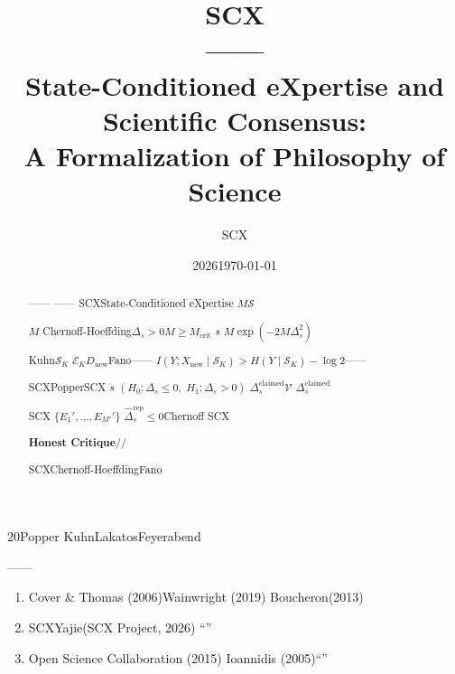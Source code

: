 \documentclass[11pt,a4paper]{article}
\title{\textbf{\LARGE SCX\\[6pt]——}\\[12pt]
\large State-Conditioned eXpertise and Scientific Consensus:\\A Formalization of Philosophy of Science}
\author{SCX}
\date{2026}
\date{\today}
\theoremstyle{remark}
\begin{document}
\maketitle

\begin{abstract}
——
——
\textbf{}SCXState-Conditioned eXpertise
$M$$\mathcal{S}$


\textbf{}$M$
Chernoff-Hoeffding$\Delta_s > 0$$M \geq M_{\text{crit}}$
$s$\textbf{}
\textbf{}$M$$\exp(-2M\Delta_s^2)$

\textbf{}Kuhn$\mathcal{S}_K$
$\mathcal{E}_K$$D_{\text{new}}$Fano——
$I(Y; X_{\text{new}} \mid \mathcal{S}_K) > H(Y \mid \mathcal{S}_K) - \log 2$——


\textbf{}SCXPopperSCX
$s$
$(H_0: \Delta_s \leq 0,\; H_1: \Delta_s > 0)$
$\Delta_s^{\text{claimed}}$$\mathcal{V}$
$\Delta_s^{\text{claimed}}$\textbf{}

\textbf{}SCX
$\{E_1',\ldots,E_{M'}'\}$
$\hat{\Delta}_s^{\text{rep}} \leq 0$Chernoff
SCX

\textbf{Honest Critique}//


\textbf{}SCXChernoff-HoeffdingFano
\end{abstract}

\section{}

\subsection{}

20Popper
KuhnLakatosFeyerabend

\textbf{}\textbf{}


——


\begin{enumerate}[label=(\arabic*)]
    \item \textbf{}
          Cover \& Thomas (2006)Wainwright (2019)
          Boucheron(2013)
    \item \textbf{}
          SCXYajie(SCX Project, 2026)
          ``''
    \item \textbf{}
          Open Science Collaboration (2015)
          Ioannidis (2005)``''
          
\end{enumerate}
\end{document}
